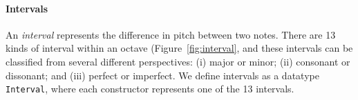 \paragraph{Intervals}

\Interval

An \emph{interval} represents the difference in pitch between
two notes.
There are 13 kinds of interval within an octave
(Figure~\ref{fig:interval}, and these intervals can be classified from
several different perspectives:
(i) major or minor; (ii) consonant or dissonant; and (iii) perfect
or imperfect.
We define intervals as a datatype \texttt{Interval}, where each
constructor represents one of the 13 intervals.
